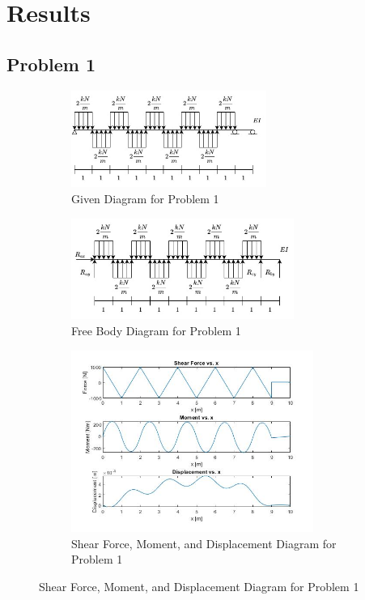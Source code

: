 \documentclass[a4paper]{article}
\begin{document}
\section{Results}\label{Results}
\subsection{Problem 1}
\begin{figure}[H]
\centering
   \begin{subfigure}[b]{\textwidth}
   \centering
   \includegraphics[width=0.7\textwidth]{problems/prob_1.jpg}
   \caption{Given Diagram for Problem 1}
   \label{prob1:prob} 
\end{subfigure}
\begin{subfigure}[b]{\textwidth}
   \centering   
   \includegraphics[width=0.8\textwidth]{FBD/FBD_1.jpg}
   \caption{Free Body Diagram for Problem 1}
   \label{prob1:FBD}
\end{subfigure}
\begin{subfigure}[b]{\textwidth}
   \centering   
   \includegraphics[width=0.87\textwidth]{results/solution_1.jpg}
   \caption{Shear Force, Moment, and Displacement Diagram for Problem 1}
   \label{prob1:results}
\end{subfigure}
\label{prob1}
\end{figure}
\end{document}

